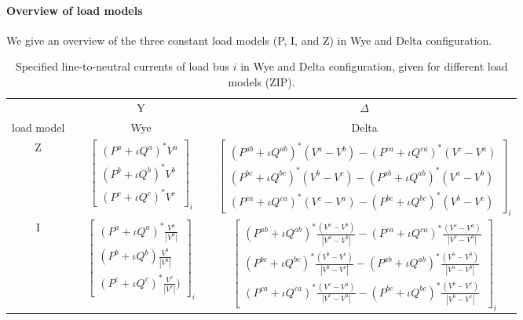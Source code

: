 \documentclass[10pt,journal]{article}
\begin{document}
\paragraph{Overview of load models}
 We give an overview of the three constant load models (P, I, and Z) in Wye and Delta configuration.
 \begin{table}[h]
\renewcommand{\arraystretch}{1.3}
\centering
\caption{Specified line-to-neutral currents of load bus $i$ in Wye and Delta configuration, given for different load models (ZIP). }\label{tab:ZIPmodels}
\begin{adjustbox}{width=1\textwidth} %
\small
\begin{tabular}{ccccc}
\toprule
{} && {Y} && {$\Delta$}  \\

 load model &&        Wye  &&        Delta\\
\midrule
Z   &&  $  \begin{bmatrix}
   ({ P^a +\iota Q^a})^*{V^a}\\
    ({ P^b +\iota Q^b})^*{V^b}\\
    ({ P^c +\iota Q^c})^*{V^c}
    \end{bmatrix}_i $ && $  \begin{bmatrix}
   ({ P^{ab} +\iota Q^{ab}})^*{(V^a-V^b)} - ({ P^{ca} +\iota Q^{ca}})^*{(V^c-V^a)} \\
     ({ P^{bc} +\iota Q^{bc}})^*{(V^b-V^c)} -  ({ P^{ab} +\iota Q^{ab}})^*{(V^a-V^b)}\\
    ({ P^{ca} +\iota Q^{ca}})^*{(V^c-V^a)} - ({ P^{bc} +\iota Q^{bc}})^*{(V^b-V^c)}
    \end{bmatrix}_i $  \\  \midrule 
I   &&  $ \begin{bmatrix}
    ({ P^a +\iota Q^a})^*\frac{V^a}{|V^a|}\\
    ({ P^b +\iota Q^b})\frac{V^b}{|V^b|}\\
    ({ P^c +\iota Q^c})^*\frac{V^c}{|V^c|})
    \end{bmatrix}_i  $ &&   $ \begin{bmatrix}
    ({ P^{ab} +\iota Q^{ab}})^*\frac{(V^a-V^b)}{|V^a-V^b|} - ({ P^{ca} +\iota Q^{ca}})^*\frac{(V^c-V^a)}{|V^c-V^a|}  \\
    ({ P^{bc} +\iota Q^{bc}})^*\frac{(V^b-V^c)}{|V^b-V^c|} - ({ P^{ab} +\iota Q^{ab}})^*\frac{(V^a-V^b)}{|V^a-V^b|}\\
    ({ P^{ca} +\iota Q^{ca}})^*\frac{(V^c-V^a)}{|V^c-V^a|} -  ({ P^{bc} +\iota Q^{bc}})^*\frac{(V^b-V^c)}{|V^b-V^c|}
    \end{bmatrix}_i $  \\ \midrule 

\end{tabular}
\end{adjustbox}
\end{table}
\end{document}
